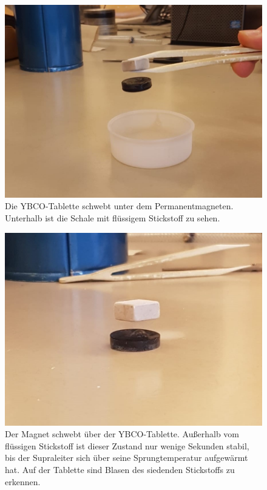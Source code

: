 \begin{figure}[H]
	\begin{center}
		\includegraphics[width=12cm]{levitation}
		\caption{Die YBCO-Tablette schwebt unter dem Permanentmagneten. Unterhalb ist die Schale mit flüssigem Stickstoff zu sehen.}
		\label{levitation}
	\end{center}
\end{figure}

\begin{figure}[H]
	\begin{center}
		\includegraphics[width=12cm]{schwebt}
		\caption{Der Magnet schwebt über der YBCO-Tablette. Außerhalb vom flüssigen Stickstoff ist dieser Zustand nur wenige Sekunden stabil, bis der Supraleiter sich über seine Sprungtemperatur aufgewärmt hat. Auf der Tablette sind Blasen des siedenden Stickstoffs zu erkennen.}
		\label{schwebt}
	\end{center}
\end{figure}


